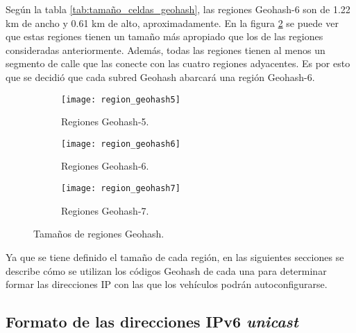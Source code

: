 Según la tabla \ref{tab:tamaño_celdas_geohash}, las regiones Geohash-6 son de
1.22 km de ancho y 0.61 km de alto, aproximadamente. En la figura
\ref{fig:region_geohash6} se puede ver que estas regiones tienen un tamaño más
apropiado que los de las regiones consideradas anteriormente.
Además, todas las regiones tienen al menos un segmento de calle que
las conecte con las cuatro regiones adyacentes. Es por esto que se decidió que
cada subred Geohash abarcará una región Geohash-6.

\begin{figure}[th!]
\centering

\begin{subfigure}{\textwidth}
\centering
\texttt{[image: region\_geohash5]} 
\caption[Regiones Geohash-5]{Regiones Geohash-5.}
\label{fig:region_geohash5}
\end{subfigure}

\vspace{0.5cm}

\begin{subfigure}{\textwidth}
\centering
\texttt{[image: region\_geohash6]} 
\caption[Regiones Geohash-6]{Regiones Geohash-6.}
\label{fig:region_geohash6}
\end{subfigure}

\vspace{0.5cm}

\begin{subfigure}{\textwidth}
\centering
\texttt{[image: region\_geohash7]} 
\caption[Regiones Geohash-7]{Regiones Geohash-7.}
\label{fig:region_geohash7}
\end{subfigure}

\vspace{0.5cm}

\decoRule
\caption[Tamaños de regiones Geohash]{Tamaños de regiones Geohash.}
\label{fig:tamaños_geohash}

\end{figure}

Ya que se tiene definido el tamaño de cada región, en las siguientes
secciones se describe cómo se utilizan los códigos Geohash de cada una para
determinar formar las direcciones IP con las que los vehículos podrán
autoconfigurarse.

\subsection{Formato de las direcciones IPv6 \textit{unicast}}

